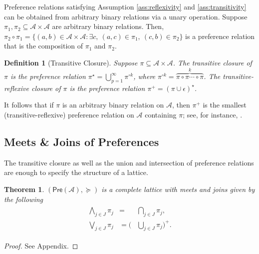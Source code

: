 \documentclass[conference]{ieeeconf}
\renewcommand{\succeq}{\succcurlyeq}
\newcommand{\A}{\mathcal{A}}
\newcommand{\Pref}{\mathsf{Pre}}
\newcommand{\bigjoin}{\bigvee}
\newcommand{\bigmeet}{\bigwedge}
\newtheorem{theorem}{Theorem}
\newtheorem{definition}{Definition}
\begin{document}
Preference relations satisfying Assumption \ref{ass:reflexivity} and \ref{ass:transitivity} can be obtained from arbitrary binary relations via a unary operation. Suppose $\pi_1, \pi_2 \subseteq \A \times \A$ are arbitrary binary relations. Then, $\pi_2 \circ \pi_1 = \{ (a,b) \in \A \times \A : \exists c,~(a,c) \in \pi_1,~(c,b) \in \pi_2 \}$ is a preference relation that is the composition of $\pi_1$ and $\pi_2$.

\begin{definition}[Transitive Closure] \label{def:transitive-closure}
    Suppose $\pi \subseteq \A \times \A$. The \emph{transitive closure} of $\pi$ is the preference relation $\pi^{\star} = \bigcup_{p=1}^{\infty} \pi^{\circ k}$, where $\pi^{\circ k} = \overbrace{\pi \circ \pi \cdots \circ \pi}^{k}$. The \emph{transitive-reflexive closure} of $\pi$ is the preference relation $\pi^{+} = \left( \pi \cup \epsilon \right)^\star$.
\end{definition}

It follows that if $\pi$ is an arbitrary binary relation on $\A$, then $\pi^{+}$ is the smallest (transitive-reflexive) preference relation on $\A$ containing $\pi$; see, for instance, \cite[Theorem 1.1\textbf{}7]{roman2008}.

\vspace{-1em}
\subsection{Meets \& Joins of Preferences}
\vspace{-0.25em}

The transitive closure as well as the union and intersection of preference relations are enough to specify the structure of a lattice.

\begin{theorem} \label{thm:complete-lattice}
    $(\Pref(\A), \succeq)$ is a complete lattice with meets and joins given by the following
    \leavevmode
    \begin{align}
    \begin{aligned}
        \bigmeet_{j \in J} \pi_j & = &\bigcap_{j \in J} \pi_j, \\
        \bigjoin_{j \in J} \pi_j & = \biggl( &\bigcup_{j \in J} \pi_j \biggr)^{+}.
    \end{aligned}\label{eq:meets-joins}
\end{align}
\end{theorem}
\begin{proof}
    See Appendix.
\end{proof}
\end{document}

